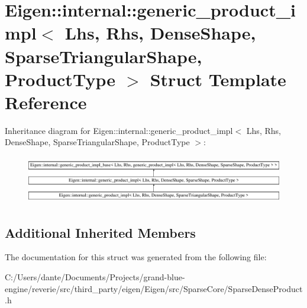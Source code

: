 \hypertarget{struct_eigen_1_1internal_1_1generic__product__impl_3_01_lhs_00_01_rhs_00_01_dense_shape_00_01_sp47812b7c46d160bb7782b8c6e085fdfe}{}\section{Eigen\+::internal\+::generic\+\_\+product\+\_\+impl$<$ Lhs, Rhs, Dense\+Shape, Sparse\+Triangular\+Shape, Product\+Type $>$ Struct Template Reference}
\label{struct_eigen_1_1internal_1_1generic__product__impl_3_01_lhs_00_01_rhs_00_01_dense_shape_00_01_sp47812b7c46d160bb7782b8c6e085fdfe}
Inheritance diagram for Eigen\+::internal\+::generic\+\_\+product\+\_\+impl$<$ Lhs, Rhs, Dense\+Shape, Sparse\+Triangular\+Shape, Product\+Type $>$\+:\begin{figure}[H]
\begin{center}
\leavevmode
\includegraphics[height=2.131979cm]{struct_eigen_1_1internal_1_1generic__product__impl_3_01_lhs_00_01_rhs_00_01_dense_shape_00_01_sp47812b7c46d160bb7782b8c6e085fdfe}
\end{center}
\end{figure}
\subsection*{Additional Inherited Members}


The documentation for this struct was generated from the following file\+:\begin{DoxyCompactItemize}
\item 
C\+:/\+Users/dante/\+Documents/\+Projects/grand-\/blue-\/engine/reverie/src/third\+\_\+party/eigen/\+Eigen/src/\+Sparse\+Core/Sparse\+Dense\+Product.\+h\end{DoxyCompactItemize}

